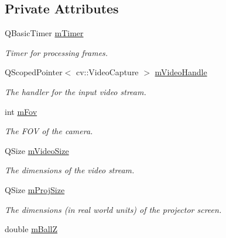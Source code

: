 \subsection*{Private Attributes}
\begin{DoxyCompactItemize}
\item 
Q\+Basic\+Timer \hyperlink{classTrackingStream_a969e6746e625d491b4355ff210a0f39a}{m\+Timer}\hypertarget{classTrackingStream_a969e6746e625d491b4355ff210a0f39a}{}\label{classTrackingStream_a969e6746e625d491b4355ff210a0f39a}

\begin{DoxyCompactList}\small\item\em Timer for processing frames. \end{DoxyCompactList}\item 
Q\+Scoped\+Pointer$<$ cv\+::\+Video\+Capture $>$ \hyperlink{classTrackingStream_ae805e55788c3e8770879568002e84e49}{m\+Video\+Handle}\hypertarget{classTrackingStream_ae805e55788c3e8770879568002e84e49}{}\label{classTrackingStream_ae805e55788c3e8770879568002e84e49}

\begin{DoxyCompactList}\small\item\em The handler for the input video stream. \end{DoxyCompactList}\item 
int \hyperlink{classTrackingStream_a34d7229ae0abe3f2f2d41e7e1ba6db7f}{m\+Fov}
\begin{DoxyCompactList}\small\item\em The F\+OV of the camera. \end{DoxyCompactList}\item 
Q\+Size \hyperlink{classTrackingStream_ae30570269be03e984c7db9e6b36163d3}{m\+Video\+Size}\hypertarget{classTrackingStream_ae30570269be03e984c7db9e6b36163d3}{}\label{classTrackingStream_ae30570269be03e984c7db9e6b36163d3}

\begin{DoxyCompactList}\small\item\em The dimensions of the video stream. \end{DoxyCompactList}\item 
Q\+Size \hyperlink{classTrackingStream_a194f58319495ea58686c142a18b65476}{m\+Proj\+Size}\hypertarget{classTrackingStream_a194f58319495ea58686c142a18b65476}{}\label{classTrackingStream_a194f58319495ea58686c142a18b65476}

\begin{DoxyCompactList}\small\item\em The dimensions (in real world units) of the projector screen. \end{DoxyCompactList}\item 
double \hyperlink{classTrackingStream_a82524ed8f3fa752684a2796c10994c4e}{m\+BallZ}\hypertarget{classTrackingStream_a82524ed8f3fa752684a2796c10994c4e}{}\label{classTrackingStream_a82524ed8f3fa752684a2796c10994c4e}


\end{DoxyCompactItemize}
